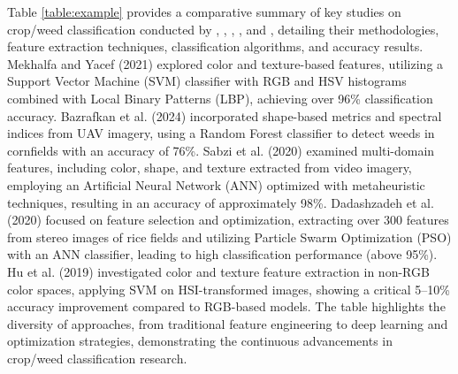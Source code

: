 \documentclass[letterpaper, notitlepage]{report}
\begin{document}
Table \ref{table:example} provides a comparative summary of key studies on crop/weed classification conducted by \cite{Mekhalfa2021-np},  \cite{Bazrafkan2024-bl}, \cite{Sabzi2020-af}, \cite{Dadashzadeh2020-pa}, and \cite{Hu2024-nv}, detailing their methodologies, feature extraction techniques, classification algorithms, and accuracy results. Mekhalfa and Yacef (2021) explored color and texture-based features, utilizing a Support Vector Machine (SVM) classifier with RGB and HSV histograms combined with Local Binary Patterns (LBP), achieving over 96\% classification accuracy. Bazrafkan et al. (2024) incorporated shape-based metrics and spectral indices from UAV imagery, using a Random Forest classifier to detect weeds in cornfields with an accuracy of 76\%. Sabzi et al. (2020) examined multi-domain features, including color, shape, and texture extracted from video imagery, employing an Artificial Neural Network (ANN) optimized with metaheuristic techniques, resulting in an accuracy of approximately 98\%. Dadashzadeh et al. (2020) focused on feature selection and optimization, extracting over 300 features from stereo images of rice fields and utilizing Particle Swarm Optimization (PSO) with an ANN classifier, leading to high classification performance (above 95\%). Hu et al. (2019) investigated color and texture feature extraction in non-RGB color spaces, applying SVM on HSI-transformed images, showing a critical 5–10\% accuracy improvement compared to RGB-based models. The table highlights the diversity of approaches, from traditional feature engineering to deep learning and optimization strategies, demonstrating the continuous advancements in crop/weed classification research.
\end{document}
